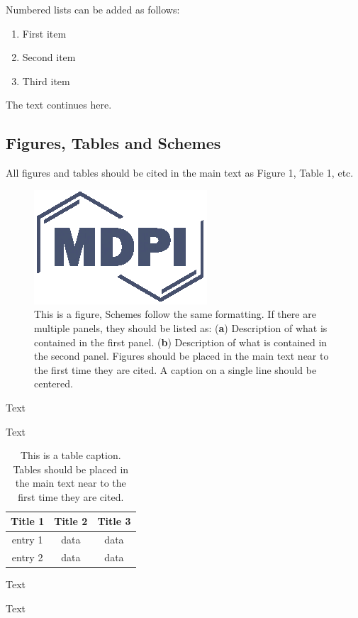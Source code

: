 \documentclass[applsci,article,submit,moreauthors,pdftex]{Definitions/mdpi}
\begin{document}
Numbered lists can be added as follows:
\begin{enumerate}[leftmargin=*,labelsep=4.9mm]
\item	First item 
\item	Second item
\item	Third item
\end{enumerate}

The text continues here.

\subsection{Figures, Tables and Schemes}

All figures and tables should be cited in the main text as Figure 1, Table 1, etc.

\begin{figure}[H]
\centering
\includegraphics[width=2 cm]{Definitions/logo-mdpi}
\caption{This is a figure, Schemes follow the same formatting. If there are multiple panels, they should be listed as: (\textbf{a}) Description of what is contained in the first panel. (\textbf{b}) Description of what is contained in the second panel. Figures should be placed in the main text near to the first time they are cited. A caption on a single line should be centered.}
\end{figure}   
 
Text

Text

\begin{table}[H]
\caption{This is a table caption. Tables should be placed in the main text near to the first time they are cited.}
\centering
\begin{tabular}{ccc}
\toprule
\textbf{Title 1}	& \textbf{Title 2}	& \textbf{Title 3}\\
\midrule
entry 1		& data			& data\\
entry 2		& data			& data\\
\bottomrule
\end{tabular}
\end{table}

Text

Text

\end{document}
